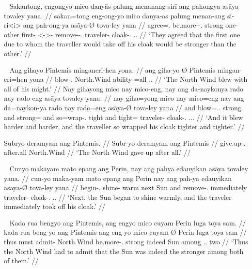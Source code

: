 \ex~ %
\begingl
	\gla Sakantong, engongyo mico danyās palung menanang sirī ang pahongya asāya tovaley yana. //
	\glb sakan=tong eng-ong-yo mico danya-as palung menan-ang si-ri<i> ang pah-ong-ya asāya-Ø tova-ley yana //
	\glc agree=\Tpl{}.\N{} be.more-\Irr{}-\Tsg{}.\N{} strong one-\Parg{} other first-\Aarg{} \Rel{}<-\Aarg{}>-\Caus{} \AgtT{} remove-\Irr{}-\Tsg{}.\M{} traveler-\Top{} cloak-\Parg{}.\Inan{} \Tsg{}.\M{}.\Gen{} //
	\glft `They agreed that the first one due to whom the traveller would take off his cloak would be stronger than the other.' //
\endgl
\xe

\pex~ %
\a \begingl
	\gla Ang gihayo {} Pintemis minganeri-hen yona. //
	\glb ang giha-yo Ø Pintemis mingan-eri=hen yona //
	\glc \AgtT{} blow-\Tsg{}.\N{} \Top{} North.Wind ability-\Ins{}=all \Tsg{}.\N{}.\Gen{} //
	\glft `The North Wind blew with all of his might.' //
\endgl
\a \begingl
	\gla Nay gihayong mico nay mico-eng, nay ang da-naykonya rado nay rado-eng asāya tovaley yana. //
	\glb nay giha=yong mico nay mico=eng nay ang da=naykon-ya rado nay rado=eng asāya-Ø tova-ley yana //
	\glc and blow=\Tsg.\N{}.\Aarg{} strong and strong=\Comp{} and \AgtT{} so=wrap-\Tsg{}.\M{} tight and tight=\Comp{} traveler-\Top{} cloak-\Parg{}.\Inan{} \Tsg{}.\M{}.\Gen{}. //
	\glft `And it blew harder and harder, and the traveller so wrapped his cloak tighter and tighter.' //
\endgl

\a \begingl
	\gla Subryo deramyam ang Pintemis. //
	\glb Subr-yo deramyam ang Pintemis //
	\glc give.up-\Tsg{}.\N{} {after.all} \Aarg{} North.Wind //
	\glft `The North Wind gave up after all.' //
\endgl
\xe

\ex~ %
\begingl
	\gla Cunyo makayam mato epang ang Perin, nay ang pahya edauyikan asāya tovaley yana. //
	\glb cun-yo maka-yam mato epang ang Perin nay ang pah-ya edauyikan asāya-Ø tova-ley yana //
	\glc begin-\Tsg{}.\N{} shine-\Ptcp{} warm next \Aarg{} Sun and \AgtT{} remove-\Tsg{}.\M{} immediately traveler-\Top{} cloak-\Parg{}.\Inan{} \Tsg{}.\M.\Gen{} //
	\glft `Next, the Sun began to shine warmly, and the traveler immediately took off his cloak.' //
\endgl
\xe

\ex~ %
\begingl
	\gla Kada rua bengyo ang Pintemis, ang engyo mico cuyam {} Perin luga toya sam. //
	\glb kada rua beng-yo ang Pintemis ang eng-yo mico cuyam Ø Perin luga toya sam //
	\glc thus must admit-\Tsg{} \Aarg{} North.Wind \AgtT{} be.more-\Tsg{}.\N{} strong indeed \Top{} Sun among \Tpl{}.\N{}.\Loc{} two //
	\glft `Thus the North Wind had to admit that the Sun was indeed the stronger among both of them.' //
\endgl
\xe

